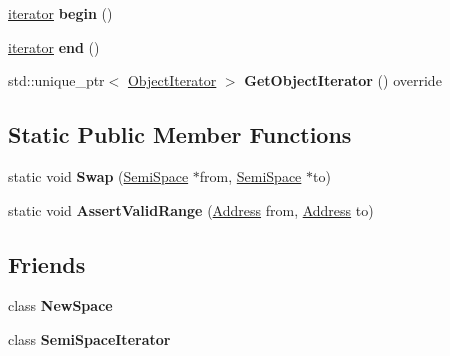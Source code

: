 \begin{DoxyCompactItemize}
\item 
\mbox{\label{classv8_1_1internal_1_1SemiSpace_a8136d80b6c840dee9d814cb9afe0b448}} 
\mbox{\hyperlink{classv8_1_1internal_1_1PageIteratorImpl}{iterator}} {\bfseries begin} ()
\item 
\mbox{\label{classv8_1_1internal_1_1SemiSpace_abf810855ae24e21076298aedda4e93f5}} 
\mbox{\hyperlink{classv8_1_1internal_1_1PageIteratorImpl}{iterator}} {\bfseries end} ()
\item 
\mbox{\label{classv8_1_1internal_1_1SemiSpace_a16dad2304a20d716bbfd9aaff4ef00c1}} 
std\+::unique\+\_\+ptr$<$ \mbox{\hyperlink{classv8_1_1internal_1_1ObjectIterator}{Object\+Iterator}} $>$ {\bfseries Get\+Object\+Iterator} () override
\end{DoxyCompactItemize}
\subsection*{Static Public Member Functions}
\begin{DoxyCompactItemize}
\item 
\mbox{\label{classv8_1_1internal_1_1SemiSpace_a12d9024e40c876221b1fc8da9ad55433}} 
static void {\bfseries Swap} (\mbox{\hyperlink{classv8_1_1internal_1_1SemiSpace}{Semi\+Space}} $\ast$from, \mbox{\hyperlink{classv8_1_1internal_1_1SemiSpace}{Semi\+Space}} $\ast$to)
\item 
\mbox{\label{classv8_1_1internal_1_1SemiSpace_ae78e80586c1013a2339790bd6f5938e2}} 
static void {\bfseries Assert\+Valid\+Range} (\mbox{\hyperlink{classuintptr__t}{Address}} from, \mbox{\hyperlink{classuintptr__t}{Address}} to)
\end{DoxyCompactItemize}
\subsection*{Friends}
\begin{DoxyCompactItemize}
\item 
\mbox{\label{classv8_1_1internal_1_1SemiSpace_a71065109e762b07b59b80cd64d885ff8}} 
class {\bfseries New\+Space}
\item 
\mbox{\label{classv8_1_1internal_1_1SemiSpace_a8b928629934cd4bbb42b079d8d3faf28}} 
class {\bfseries Semi\+Space\+Iterator}
\end{DoxyCompactItemize}
